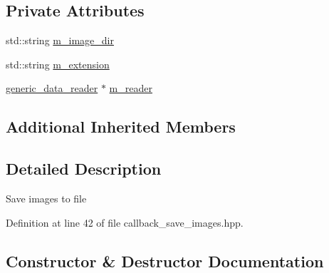 \subsection*{Private Attributes}
\begin{DoxyCompactItemize}
\item 
std\+::string \hyperlink{classlbann_1_1lbann__callback__save__images_aeb69e2814c78d33a93b9ddc276c4cc57}{m\+\_\+image\+\_\+dir}
\item 
std\+::string \hyperlink{classlbann_1_1lbann__callback__save__images_a7b37fa08f49051897ef427b8c810ca3a}{m\+\_\+extension}
\item 
\hyperlink{classlbann_1_1generic__data__reader}{generic\+\_\+data\+\_\+reader} $\ast$ \hyperlink{classlbann_1_1lbann__callback__save__images_a275e409b2b2f3ebe2baeea636e18c607}{m\+\_\+reader}
\end{DoxyCompactItemize}
\subsection*{Additional Inherited Members}


\subsection{Detailed Description}
Save images to file 

Definition at line 42 of file callback\+\_\+save\+\_\+images.\+hpp.



\subsection{Constructor \& Destructor Documentation}
\mbox{\label{classlbann_1_1lbann__callback__save__images_a19825aa8f1bc28114a5269bee6c88758}} 
